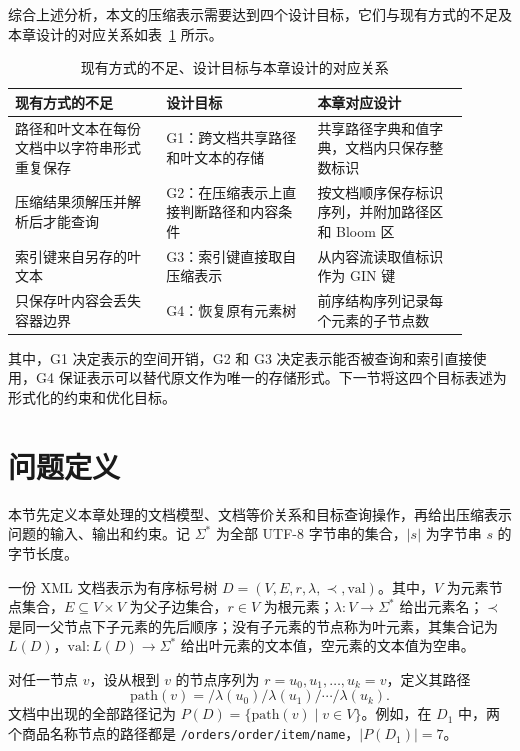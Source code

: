 综合上述分析，本文的压缩表示需要达到四个设计目标，它们与现有方式的不足及本章设计的对应关系如表~\ref{tab:rep-goals} 所示。

\begin{table}[htbp]
\centering\small
\caption{现有方式的不足、设计目标与本章设计的对应关系}
\label{tab:rep-goals}
\begin{tabular}{p{0.30\linewidth}p{0.30\linewidth}p{0.30\linewidth}}
\toprule
现有方式的不足 & 设计目标 & 本章对应设计 \\
\midrule
路径和叶文本在每份文档中以字符串形式重复保存 & G1：跨文档共享路径和叶文本的存储 & 共享路径字典和值字典，文档内只保存整数标识 \\
压缩结果须解压并解析后才能查询 & G2：在压缩表示上直接判断路径和内容条件 & 按文档顺序保存标识序列，并附加路径区和 Bloom 区 \\
索引键来自另存的叶文本 & G3：索引键直接取自压缩表示 & 从内容流读取值标识作为 GIN 键 \\
只保存叶内容会丢失容器边界 & G4：恢复原有元素树 & 前序结构序列记录每个元素的子节点数 \\
\bottomrule
\end{tabular}
\end{table}

其中，G1 决定表示的空间开销，G2 和 G3 决定表示能否被查询和索引直接使用，G4 保证表示可以替代原文作为唯一的存储形式。下一节将这四个目标表述为形式化的约束和优化目标。

\section{问题定义}
\label{sec:rep-definition}

本节先定义本章处理的文档模型、文档等价关系和目标查询操作，再给出压缩表示问题的输入、输出和约束。记 $\Sigma^{*}$ 为全部 UTF-8 字节串的集合，$|s|$ 为字节串 $s$ 的字节长度。

\begin{definition}[XML 文档]
\label{def:rep-document}
一份 XML 文档表示为有序标号树 $D=(V,E,r,\lambda,\prec,\mathrm{val})$。其中，$V$ 为元素节点集合，$E\subseteq V\times V$ 为父子边集合，$r\in V$ 为根元素；$\lambda:V\to\Sigma^{*}$ 给出元素名；$\prec$ 是同一父节点下子元素的先后顺序；没有子元素的节点称为叶元素，其集合记为 $L(D)$，$\mathrm{val}:L(D)\to\Sigma^{*}$ 给出叶元素的文本值，空元素的文本值为空串。
\end{definition}

对任一节点 $v$，设从根到 $v$ 的节点序列为 $r=u_0,u_1,\ldots,u_k=v$，定义其路径
\[
\mathrm{path}(v)=/\lambda(u_0)/\lambda(u_1)/\cdots/\lambda(u_k).
\]
文档中出现的全部路径记为 $P(D)=\{\mathrm{path}(v)\mid v\in V\}$。例如，在 $D_1$ 中，两个商品名称节点的路径都是 \texttt{/orders/order/item/name}，$|P(D_1)|=7$。

